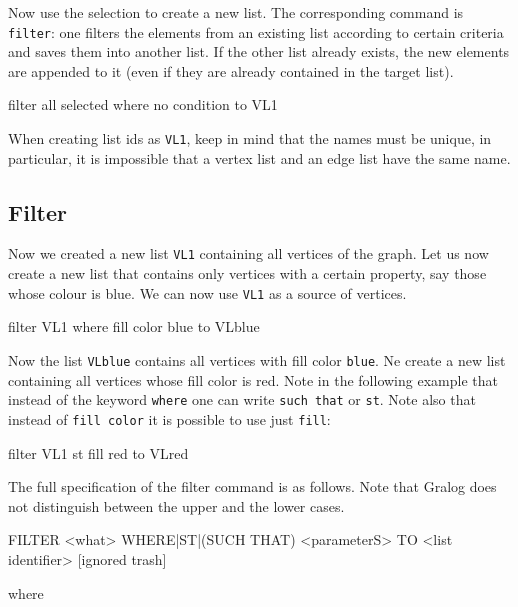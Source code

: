 Now use the selection to create a new list. The corresponding command
is \texttt{filter}: one filters the elements from an existing list
according to certain criteria and saves them into another list. If the
other list already exists, the new elements are appended to it (even
if they are already contained in the target list). 

\begin{tcolorbox}
  filter all selected where no condition to VL1
\end{tcolorbox}

When creating list ids as \texttt{VL1}, keep in mind that the names
must be unique, in particular, it is impossible that a vertex list and
an edge list have the same name.

\subsection{Filter}

Now we created a new list \texttt{VL1} containing all vertices of the
graph. Let us now create a new list that contains only vertices with a
certain property, say those whose colour is blue. We can now use
\texttt{VL1} as a source of vertices.

\begin{tcolorbox}
  filter VL1 where fill color blue to VLblue
\end{tcolorbox}

Now the list \texttt{VLblue} contains all vertices with fill color
\texttt{blue}. Ne create a new list containing all vertices whose fill
color is red. Note in the following example that instead of the
keyword \texttt{where} one can write \texttt{such that} or
\texttt{st}. Note also that instead of \texttt{fill color} it is
possible to use just \texttt{fill}:

\begin{tcolorbox}
  filter VL1 st fill red to VLred
\end{tcolorbox}

The full specification of the filter command is as follows. Note that
Gralog does not distinguish between the upper and the lower cases.


\begin{tcolorbox}[colback=lightpink]
  FILTER <what> WHERE|ST|(SUCH THAT) <parameterS> TO <list identifier>
  [ignored trash]
\end{tcolorbox}
 
\noindent where

